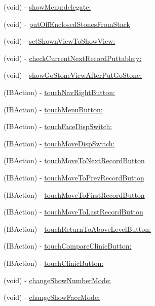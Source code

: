 \begin{DoxyCompactItemize}
(void) -\/ \hyperlink{interface_abstract_record_view_controller_a1a4c889e86c8c7bbb2ec7292b4c1d851}{showMenu:delegate:}
\item 
(void) -\/ \hyperlink{interface_abstract_record_view_controller_acfef3c389bc87c5501223a0340bb5d42}{putOffEnclosedStonesFromStack}
\item 
(void) -\/ \hyperlink{interface_abstract_record_view_controller_a365a47e75f13c7d8cd6fde2ca88f12f7}{setShownViewToShowView:}
\item 
(void) -\/ \hyperlink{interface_abstract_record_view_controller_a8c9a3720bbcb3ac55d0697c1372b0f8b}{checkCurrentNextRecordPuttable:y:}
\item 
(void) -\/ \hyperlink{interface_abstract_record_view_controller_a43260aab3d69a602122591e38ccec220}{showGoStoneViewAfterPutGoStone:}
\item 
(IBAction) -\/ \hyperlink{interface_abstract_record_view_controller_a6117104a05041dc47753c5e918005b5e}{touchNavRightButton:}
\item 
(IBAction) -\/ \hyperlink{interface_abstract_record_view_controller_a1bd01a686778e5e9f78f178275743d8e}{touchMenuButton:}
\item 
(IBAction) -\/ \hyperlink{interface_abstract_record_view_controller_a96715e03545a334e6130b497c5c7a5ff}{touchFaceDispSwitch:}
\item 
(IBAction) -\/ \hyperlink{interface_abstract_record_view_controller_addab1ecf92b8c94664a76e93a3744133}{touchMoveDispSwitch:}
\item 
(IBAction) -\/ \hyperlink{interface_abstract_record_view_controller_ac75c7fabdaa79350a66fa780b9370154}{touchMoveToNextRecordButton}
\item 
(IBAction) -\/ \hyperlink{interface_abstract_record_view_controller_a0d8602c8641f0723f55f850e309d2f4d}{touchMoveToPrevRecordButton}
\item 
(IBAction) -\/ \hyperlink{interface_abstract_record_view_controller_abbf7fe8a46b086e5f5a1c1d816eeb0ce}{touchMoveToFirstRecordButton}
\item 
(IBAction) -\/ \hyperlink{interface_abstract_record_view_controller_aa8a3e0d475eafdfaf76cc971b7f9bb76}{touchMoveToLastRecordButton}
\item 
(IBAction) -\/ \hyperlink{interface_abstract_record_view_controller_a244fc7ff5da9673ecab53aa9020c4724}{touchReturnToAboveLevelButton:}
\item 
(IBAction) -\/ \hyperlink{interface_abstract_record_view_controller_aecfc6bd891d5023408a112f650722707}{touchCompareClinicButton:}
\item 
(IBAction) -\/ \hyperlink{interface_abstract_record_view_controller_adccc7ca97972b19a575f96c85abe0015}{touchClinicButton:}
\item 
(void) -\/ \hyperlink{interface_abstract_record_view_controller_a61cf4619df8c1c42a50f5b38309ebf81}{changeShowNumberMode:}
\item 
(void) -\/ \hyperlink{interface_abstract_record_view_controller_a5ba7f163218b658a28ab36e5c53fda57}{changeShowFaceMode:}
\end{DoxyCompactItemize}

